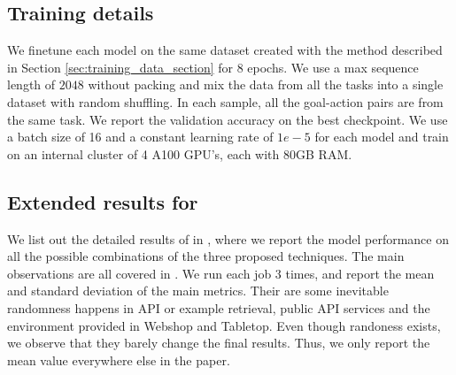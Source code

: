 \subsection{Training details}

We finetune each model on the same dataset created with the method described in Section \ref{sec:training_data_section} for $8$ epochs. We use a max sequence length of $2048$ without packing and mix the data from all the tasks into a single dataset with random shuffling. In each sample, all the goal-action pairs are from the same task. We report the validation accuracy on the best checkpoint. We use a batch size of 16 and a constant learning rate of $1e-5$ for each model and train on an internal cluster of 4 A100 GPU's, each with 80GB RAM.






\subsection{Extended results for }
We list out the detailed results of  in , where we report the model performance on all the possible combinations of the three proposed techniques. The main observations are all covered in . We run each job 3 times, and report the mean and standard deviation of the main metrics. Their are some inevitable randomness happens in API or example retrieval, public API services and the environment provided in Webshop and Tabletop. Even though randoness exists, we observe that they barely change the final results. Thus, we only report the mean value everywhere else in the paper.



